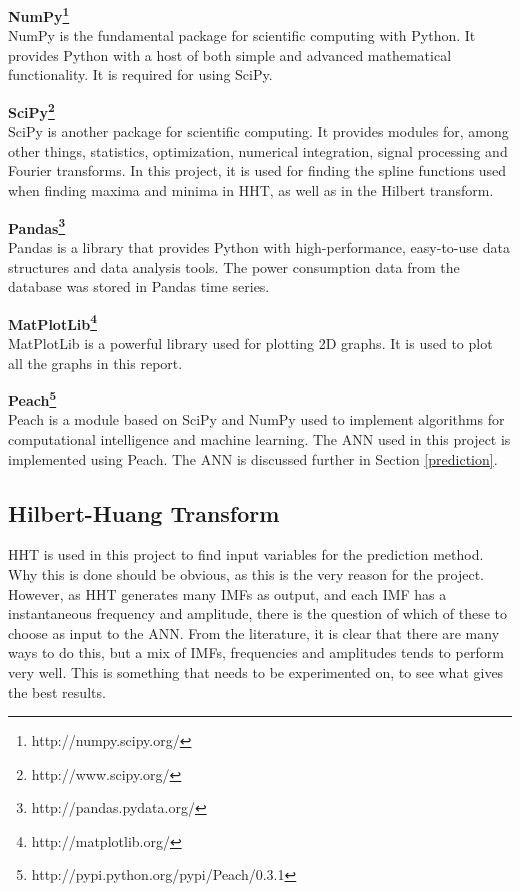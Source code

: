 \documentclass[12pt]{article}
\begin{document}
\begin{description}
\item \textbf{NumPy\footnote{http://numpy.scipy.org/}} \hfill \\
NumPy is the fundamental package for scientific computing with Python. It provides Python with a host of both simple and advanced mathematical functionality. It is required for using SciPy.
\item \textbf{SciPy\footnote{http://www.scipy.org/}} \hfill \\
SciPy is another package for scientific computing. It provides modules for, among other things, statistics, optimization, numerical integration, signal processing and Fourier transforms. In this project, it is used for finding the spline functions used when finding maxima and minima in HHT, as well as in the Hilbert transform.
\item \textbf{Pandas\footnote{http://pandas.pydata.org/}} \hfill \\
Pandas is a library that provides Python with high-performance, easy-to-use data structures and data analysis tools. The power consumption data from the database was stored in Pandas time series.
\item \textbf{MatPlotLib\footnote{http://matplotlib.org/}} \hfill \\
MatPlotLib is a powerful library used for plotting 2D graphs. It is used to plot all the graphs in this report.
\item \textbf{Peach\footnote{http://pypi.python.org/pypi/Peach/0.3.1}} \hfill \\
Peach is a module based on SciPy and NumPy used to implement algorithms for computational intelligence and machine learning. The ANN used in this project is implemented using Peach. The ANN is discussed further in Section \ref{prediction}.
\end{description}

\subsection{Hilbert-Huang Transform}
\label{hht}
HHT is used in this project to find input variables for the prediction method. Why this is done should be obvious, as this is the very reason for the project. However, as HHT generates many IMFs as output, and each IMF has a instantaneous frequency and amplitude, there is the question of which of these to choose as input to the ANN. From the literature, it is clear that there are many ways to do this, but a mix of IMFs, frequencies and amplitudes tends to perform very well. This is something that needs to be experimented on, to see what gives the best results. 
\end{document}

